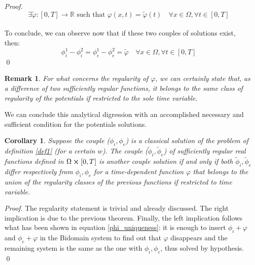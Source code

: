 \documentclass[a4paper,11pt]{article}
\newtheorem*{remark}{Remark}
\newtheorem{corollary}{Corollary}
\begin{document}
\begin{proof}
	\begin{equation*}
	\exists \tilde{\varphi}:[0,T]\rightarrow \mathbb{R} \text{ such that } \varphi(x,t) = \tilde{\varphi}(t) \quad \forall x \in \Omega,\forall t \in [0,T] 
	\end{equation*}\\
	To conclude, we can observe now that if these two couples of solutions exist, then:
	\begin{equation*}
	\phi_i^1-\phi_i^2 = \phi_e^1-\phi_e^2=\tilde{\varphi} \quad \forall x \in \Omega, \forall t \in [0,T]
	\end{equation*} \qed
\end{proof}

\begin{remark}
For what concerns the regularity of $\varphi$, we can certainly state that, as a difference of two sufficiently regular functions, it belongs to the same class of regularity of the potentials if restricted to the sole time variable.
\end{remark}

\vspace{4mm}
\noindent We can conclude this analytical digression with an accomplished necessary and sufficient condition for the potentials solutions. \vspace{4mm}

\begin{corollary}
Suppose the couple ($\phi_i,\phi_e$) is a classical solution of the problem of definition \ref{def1} (for a certain $w$). The couple ($\tilde{\phi}_i,\tilde{\phi}_e$) of sufficiently regular real functions defined in $\Omega\cross[0,T]$ is another couple solution if and only if both $\tilde{\phi}_i,\tilde{\phi}_e$ differ respectively from $\phi_i,\phi_e$ for a time-dependent function $\varphi$ that belongs to the union of the regularity classes of the previous functions if restricted to time variable.
\end{corollary}

\begin{proof}
	The regularity statement is trivial and already discussed. The right implication is due to the previous theorem. Finally, the left implication follows what has been shown in equation \ref{phi_uniqueness}: it is enough to insert $\phi_i+\varphi$ and $\phi_e+\varphi$ in the Bidomain system to find out that $\varphi$ disappears and the remaining system is the same as the one with $\phi_i,\phi_e$, thus solved by hypothesis. \qed
\end{proof}
\vspace{4mm}
\end{document}
